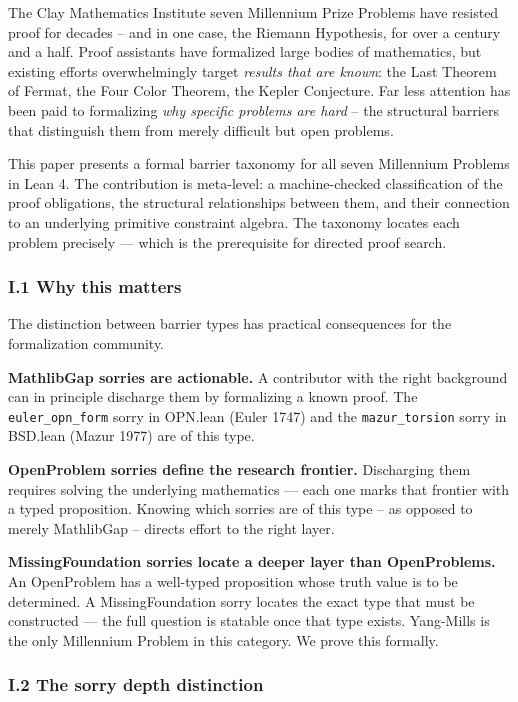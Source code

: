 \documentclass[12pt,a4paper]{article}
\begin{document}
The Clay Mathematics Institute seven Millennium Prize Problems have resisted proof for decades  --  and in one case, the Riemann Hypothesis, for over a century and a half. Proof assistants have formalized large bodies of mathematics, but existing efforts overwhelmingly target \emph{results that are known}: the Last Theorem of Fermat, the Four Color Theorem, the Kepler Conjecture. Far less attention has been paid to formalizing \emph{why specific problems are hard}  --  the structural barriers that distinguish them from merely difficult but open problems.

This paper presents a formal barrier taxonomy for all seven Millennium Problems in Lean 4. The contribution is meta-level: a machine-checked classification of the proof obligations, the structural relationships between them, and their connection to an underlying primitive constraint algebra. The taxonomy locates each problem precisely --- which is the prerequisite for directed proof search.

\subsubsection{I.1 Why this matters}

The distinction between barrier types has practical consequences for the formalization community.

\textbf{MathlibGap sorries are actionable.} A contributor with the right background can in principle discharge them by formalizing a known proof. The \texttt{euler\_opn\_form} sorry in OPN.lean (Euler 1747) and the \texttt{mazur\_torsion} sorry in BSD.lean (Mazur 1977) are of this type.

\textbf{OpenProblem sorries define the research frontier.} Discharging them requires solving the underlying mathematics --- each one marks that frontier with a typed proposition. Knowing which sorries are of this type  --  as opposed to merely MathlibGap  --  directs effort to the right layer.

\textbf{MissingFoundation sorries locate a deeper layer than OpenProblems.} An OpenProblem has a well-typed proposition whose truth value is to be determined. A MissingFoundation sorry locates the exact type that must be constructed --- the full question is statable once that type exists. Yang-Mills is the only Millennium Problem in this category. We prove this formally.

\subsubsection{I.2 The sorry depth distinction}
\end{document}
